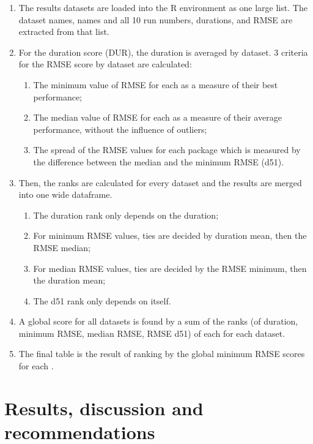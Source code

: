 \begin{enumerate}
\def\labelenumi{\arabic{enumi}.}
\tightlist
\item
  The results datasets are loaded into the R environment as one large
  list. The dataset names,  names and all 10 run
  numbers, durations, and RMSE are extracted from that list.
\item
  For the duration score (DUR), the duration is averaged by dataset. 3
  criteria for the RMSE score by dataset are calculated:

  \begin{enumerate}
  \def\labelenumii{\alph{enumii}.}
  \tightlist
  \item
    The minimum value of RMSE for each  as a
    measure of their best performance;
  \item
    The median value of RMSE for each  as a
    measure of their average performance, without the influence of
    outliers;
  \item
    The spread of the RMSE values for each package which is measured by
    the difference between the median and the minimum RMSE (d51).
  \end{enumerate}
\item
  Then, the ranks are calculated for every dataset and the results are
  merged into one wide dataframe.

  \begin{enumerate}
  \def\labelenumii{\alph{enumii}.}
  \tightlist
  \item
    The duration rank only depends on the duration;
  \item
    For minimum RMSE values, ties are decided by duration mean, then the
    RMSE median;
  \item
    For median RMSE values, ties are decided by the RMSE minimum, then
    the duration mean;
  \item
    The d51 rank only depends on itself.
  \end{enumerate}
\item
  A global score for all datasets is found by a sum of the ranks (of
  duration, minimum RMSE, median RMSE, RMSE d51) of each
   for each dataset.
\item
  The final table is the result of ranking by the global minimum RMSE
  scores for each .
\end{enumerate}

\hypertarget{results-discussion-and-recommendations}{%
\section{Results, discussion and
recommendations}\label{results-discussion-and-recommendations}}

